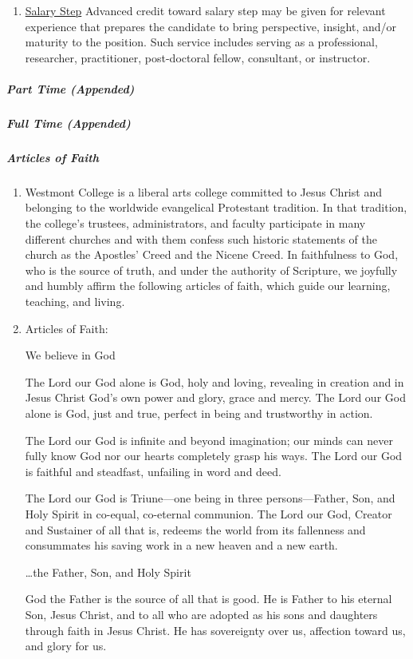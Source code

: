 \begin{enumerate}[label=\alph*)]
					\item{\underline{Salary Step} Advanced credit toward salary
						step may be given for relevant experience that prepares the
						candidate to bring perspective, insight, and/or maturity to
						the position.  Such service includes serving as a
						professional, researcher, practitioner, post-doctoral
						fellow, consultant, or instructor.}

				\end{enumerate}
				\subparagraph{Part Time (Appended)}
				\subparagraph{Full Time (Appended)}
				\subparagraph{Articles of Faith}
					\label{sec:ArticlesOfFaith}
					\begin{enumerate}[label=\alph*)]
						\item{Westmont College is a liberal arts college committed to Jesus Christ and belonging to the worldwide evangelical Protestant tradition.  In that tradition, the college's trustees, administrators, and faculty participate in many different churches and with them confess such historic statements of the church as the Apostles' Creed and the Nicene Creed. In faithfulness to God, who is the source of truth, and under the authority of Scripture, we joyfully and humbly affirm the following articles of faith, which guide our learning, teaching, and living.}
						\item{Articles of Faith:}

						\quad We believe in God

						\quad The Lord our God alone is God, holy and loving, revealing in creation and in Jesus Christ God's own power and glory, grace and mercy. The Lord our God alone is God, just and true, perfect in being and trustworthy in action.

						\quad The Lord our God is infinite and beyond imagination; our minds can never fully know God nor our hearts completely grasp his ways. The Lord our God is faithful and steadfast, unfailing in word and deed.

						\quad The Lord our God is Triune---one being in three persons---Father, Son, and Holy Spirit in co-equal, co-eternal communion. The Lord our God, Creator and Sustainer of all that is, redeems the world from its fallenness and consummates his saving work in a new heaven and a new earth.

						\quad \dots the Father, Son, and Holy Spirit

						\quad God the Father is the source of all that is good. He is Father to his eternal Son, Jesus Christ, and to all who are adopted as his sons and daughters through faith in Jesus Christ. He has sovereignty over us, affection toward us, and glory for us.


\end{enumerate}
